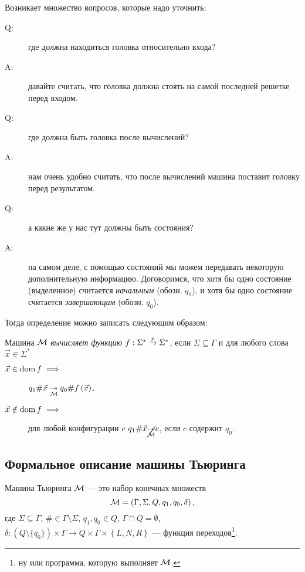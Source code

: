 Возникает множество вопросов, которые надо уточнить:
\begin{description}
    \item[Q:] где должна находиться головка относительно входа?
    \item[A:] давайте считать, что головка должна стоять на самой последней решетке перед входом.
    \item[Q:] где должна быть головка после вычислений?
    \item[A:] нам очень удобно считать, что после вычислений машина поставит головку перед результатом.
    \item[Q:] а какие же у нас тут должны быть состояния?
    \item[A:] на самом деле, с помощью состояний мы можем передавать некоторую дополнительную информацию.
    Договоримся, что хотя бы одно состояние (выделенное) считается {\it начальным} (обозн. $q_{1}$), и хотя бы одно состояние считается {\it завершающим} (обозн. $q_{0}$).
\end{description}
Тогда определение можно записать следующим образом:
\begin{definition}
    Машина $\mathcal{M}$ {\it вычисляет функцию} $f: \Sigma^{*} \overset{p}{\to} \Sigma^{*}$, если $\Sigma \subseteq \Gamma$ и для любого слова $\vec{x} \in  \Sigma^{*}$
    \begin{description}
        \item[$\vec{x} \in \operatorname{dom} f \implies$] $q_{1}\#\vec{x} \underset{\mathcal{M}}{\twoheadrightarrow} q_{0}\#f\left(\vec{x}\right)$.
        \item[$\vec{x} \notin \operatorname{dom} f \implies$] для любой конфигурации $c$ $q_{1} \# \vec{x} \cancel{\underset{\mathcal{M}}{\twoheadrightarrow}} c$, если $c$ содержит $q_{0}$.
    \end{description}
\end{definition}

\subsection{Формальное описание машины Тьюринга}

\begin{definition}
    Машина Тьюринга $\mathcal{M}$ --- это набор конечных множеств
    $$
        \mathcal{M} = \left(\Gamma, \Sigma, Q, q_{1}, q_{0}, \delta\right),
    $$
    где $\Sigma \subseteq \Gamma$, $\# \in \Gamma \setminus \Sigma$, $q_{1}, q_{0} \in Q$, $\Gamma \cap Q = \emptyset$, $\delta: \left(Q \setminus \{q_{0}\}\right) \times \Gamma \to Q \times \Gamma \times \left\{L, N, R\right\}$ --- функция переходов\footnote{ну или программа, которую выполняет $\mathcal{M}$.}.
\end{definition}


